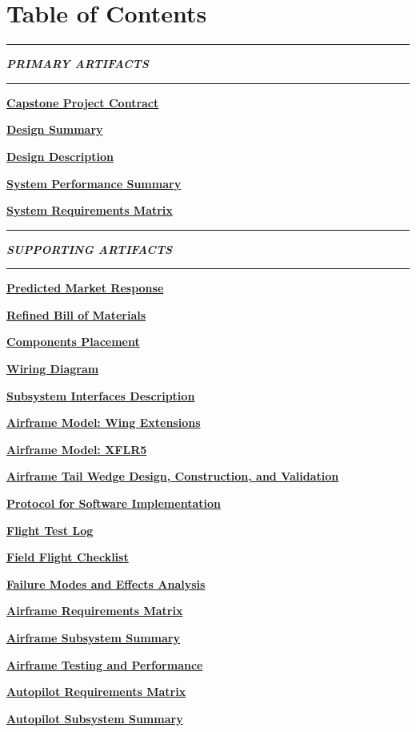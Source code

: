 \documentclass[]{article}
\newcommand{\pdflink}[2]{
\hyperlink{#1.1}{\textbf{#2}}
}
\begin{document}



\section*{Table of Contents}

\hrule

\textbf{\textit{PRIMARY ARTIFACTS}}

\hrule

\pdflink{proj_cont}{Capstone Project Contract}

\pdflink{des_sum}{Design Summary}

\pdflink{des_des}{Design Description}

\pdflink{sys_per}{System Performance Summary}

\pdflink{req_mat}{System Requirements Matrix}

\hrule

\textbf{\textit{SUPPORTING ARTIFACTS}}

\hrule

\pdflink{mar_res}{Predicted Market Response}

\pdflink{bil_mat}{Refined Bill of Materials}

\pdflink{com_pla}{Components Placement}

\pdflink{wd}{Wiring Diagram}

\pdflink{sub_int}{Subsystem Interfaces Description}

\pdflink{amwe}{Airframe Model: Wing Extensions}

\pdflink{amxflr}{Airframe Model: XFLR5}

\pdflink{atwt}{Airframe Tail Wedge Design, Construction, and Validation}

\pdflink{pfsi}{Protocol for Software Implementation}

\pdflink{fl}{Flight Test Log}

\pdflink{ffcl}{Field Flight Checklist}

\pdflink{fmea}{Failure Modes and Effects Analysis}

\pdflink{air_req}{Airframe Requirements Matrix}

\pdflink{air_des}{Airframe Subsystem Summary}

\pdflink{air_tes}{Airframe Testing and Performance}

\pdflink{con_req}{Autopilot Requirements Matrix}

\pdflink{con_sum}{Autopilot Subsystem Summary}
\end{document}
